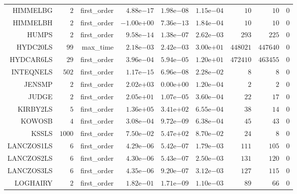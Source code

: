 \begin{longtable}{rrrrrrrrr}
HIMMELBG & \(     2\) & first\_order & \( 4.88\)e\(-17\) & \( 1.98\)e\(-08\) & \( 1.15\)e\(-04\) & \(    10\) & \(    10\) & \(     0\) \\
HIMMELBH & \(     2\) & first\_order & \(-1.00\)e\(+00\) & \( 7.36\)e\(-13\) & \( 1.84\)e\(-04\) & \(    10\) & \(    10\) & \(     0\) \\
HUMPS & \(     2\) & first\_order & \( 9.58\)e\(-14\) & \( 1.38\)e\(-07\) & \( 2.62\)e\(-03\) & \(   293\) & \(   225\) & \(     0\) \\
HYDC20LS & \(    99\) & max\_time & \( 2.18\)e\(-03\) & \( 2.42\)e\(-03\) & \( 3.00\)e\(+01\) & \(448021\) & \(447640\) & \(     0\) \\
HYDCAR6LS & \(    29\) & first\_order & \( 3.96\)e\(-04\) & \( 5.94\)e\(-05\) & \( 1.20\)e\(+01\) & \(472410\) & \(463455\) & \(     0\) \\
INTEQNELS & \(   502\) & first\_order & \( 1.17\)e\(-15\) & \( 6.96\)e\(-08\) & \( 2.28\)e\(-02\) & \(     8\) & \(     8\) & \(     0\) \\
JENSMP & \(     2\) & first\_order & \( 2.02\)e\(+03\) & \( 0.00\)e\(+00\) & \( 1.20\)e\(-04\) & \(     2\) & \(     2\) & \(     0\) \\
JUDGE & \(     2\) & first\_order & \( 2.05\)e\(+01\) & \( 1.07\)e\(-05\) & \( 3.60\)e\(-04\) & \(    22\) & \(    17\) & \(     0\) \\
KIRBY2LS & \(     5\) & first\_order & \( 1.36\)e\(+05\) & \( 3.41\)e\(+02\) & \( 6.55\)e\(-04\) & \(    38\) & \(    14\) & \(     0\) \\
KOWOSB & \(     4\) & first\_order & \( 3.08\)e\(-04\) & \( 9.72\)e\(-09\) & \( 6.38\)e\(-04\) & \(    45\) & \(    43\) & \(     0\) \\
KSSLS & \(  1000\) & first\_order & \( 7.50\)e\(-02\) & \( 5.47\)e\(+02\) & \( 8.70\)e\(-02\) & \(    24\) & \(     8\) & \(     0\) \\
LANCZOS1LS & \(     6\) & first\_order & \( 4.29\)e\(-06\) & \( 5.42\)e\(-07\) & \( 1.79\)e\(-03\) & \(   111\) & \(   105\) & \(     0\) \\
LANCZOS2LS & \(     6\) & first\_order & \( 4.30\)e\(-06\) & \( 5.43\)e\(-07\) & \( 2.50\)e\(-03\) & \(   131\) & \(   120\) & \(     0\) \\
LANCZOS3LS & \(     6\) & first\_order & \( 4.35\)e\(-06\) & \( 9.20\)e\(-07\) & \( 3.12\)e\(-03\) & \(   127\) & \(   115\) & \(     0\) \\
LOGHAIRY & \(     2\) & first\_order & \( 1.82\)e\(-01\) & \( 1.71\)e\(-09\) & \( 1.10\)e\(-03\) & \(    89\) & \(    66\) & \(     0\) \\

\end{longtable}
